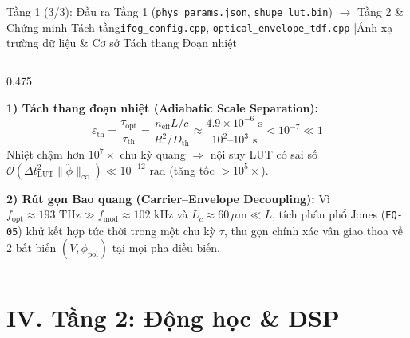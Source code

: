 \documentclass[aspectratio=169,8pt]{beamer}
\begin{document}
\begin{frame}{Tầng 1 (3/3): Đầu ra Tầng 1 (\texttt{phys\_params.json}, \texttt{shupe\_lut.bin}) $\to$ Tầng 2 \& Chứng minh Tách tầng}{\texttt{ifog\_config.cpp}, \texttt{optical\_envelope\_tdf.cpp} \enspace|\enspace Ánh xạ trường dữ liệu \& Cơ sở Tách thang Đoạn nhiệt}
\begin{columns}[T]
\begin{column}{0.475\textwidth}
\begin{tcolorbox}
    \end{tcolorbox}
    \vspace{0.05cm}
    \begin{remarkbox}
      {\scriptsize
      \textbf{1) Tách thang đoạn nhiệt (Adiabatic Scale Separation):}
      \[
        \varepsilon_{\text{th}} = \frac{\tau_{\text{opt}}}{\tau_{\text{th}}} = \frac{n_{\text{eff}}L/c}{R^2/D_{\text{th}}} \approx \frac{4.9{\times}10^{-6}\text{ s}}{10^2\text{--}10^3\text{ s}} < 10^{-7} \ll 1
      \]
      Nhiệt chậm hơn $10^7\times$ chu kỳ quang $\Rightarrow$ nội suy LUT có sai số $\mathcal{O}(\Delta t_{\text{LUT}}^2\|\ddot{\phi}\|_\infty)\ll 10^{-12}\text{ rad}$ (tăng tốc $>10^5\times$).

      \vspace{2.5pt}
      \textbf{2) Rút gọn Bao quang (Carrier–Envelope Decoupling):}
      Vì $f_{\text{opt}}\approx 193\text{ THz}\gg f_{\text{mod}}\approx 102\text{ kHz}$ và $L_c\approx 60\,\mu\text{m}\ll L$, tích phân phổ Jones (\texttt{EQ-05}) khử kết hợp tức thời trong một chu kỳ $\tau$, thu gọn chính xác vân giao thoa về 2 bất biến $(V,\phi_{\text{pol}})$ tại mọi pha điều biến.}
    \end{remarkbox}
  \end{column}
\end{columns}
\end{frame}

\section{IV. Tầng 2: Động học \& DSP}
\end{document}
